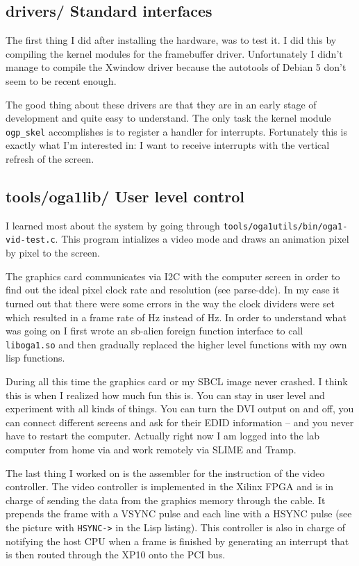 \documentclass[%
  DIV19]{scrartcl}
\begin{document}
\subsection{drivers/ Standard interfaces}
The first thing I did after installing the hardware, was to test it.
I did this by compiling the kernel modules for the framebuffer driver.
Unfortunately I didn't manage to compile the Xwindow driver because
the autotools of Debian 5 don't seem to be recent enough.

The good thing about these drivers are that they are in an early stage
of development and quite easy to understand. The only task the kernel
module \verb!ogp_skel! accomplishes is to register a handler for
interrupts. Fortunately this is exactly what I'm interested in: I want
to receive interrupts with the vertical refresh of the screen.

\subsection{tools/oga1lib/ User level control}
I learned most about the system by going through
\verb!tools/oga1utils/bin/oga1-vid-test.c!. This program intializes a
video mode and draws an animation pixel by pixel to the screen.

The graphics card communicates via I2C with the computer screen in
order to find out the ideal pixel clock rate and resolution (see
parse-ddc). In my case it turned out that there were some errors in
the way the clock dividers were set which resulted in a frame rate of
\unit[47]{Hz} instead of \unit[60]{Hz}. In order to understand what
was going on I first wrote an sb-alien foreign function interface to
call \verb!liboga1.so! and then gradually replaced the higher level
functions with my own lisp functions.

During all this time the graphics card or my SBCL image never crashed.
I think this is when I realized how much fun this is. You can stay in
user level and experiment with all kinds of things. You can turn the
DVI output on and off, you can connect different screens and ask for
their EDID information -- and you never have to restart the
computer. Actually right now I am logged into the lab computer from
home via and work remotely via SLIME and Tramp.

The last thing I worked on is the assembler for the instruction of the
video controller. The video controller is implemented in the Xilinx
FPGA and is in charge of sending the data from the graphics memory
through the cable. It prepends the frame with a VSYNC pulse and each
line with a HSYNC pulse (see the picture with \verb!HSYNC->! in the
Lisp listing). This controller is also in charge of notifying the host
CPU when a frame is finished by generating an interrupt that is then
routed through the XP10 onto the PCI bus.
\end{document}
